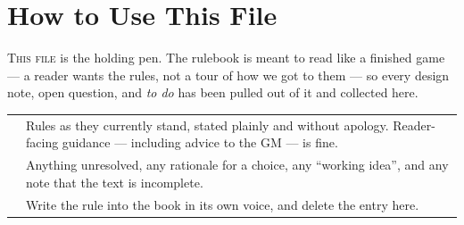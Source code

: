 \documentclass[11pt,oneside]{memoir}
\newcommand{\thc}[1]{\leavevmode{\hdfont\bfseries\color{white}#1}}
\begin{document}
\color{atrInk}

\begin{titlingpage}
\end{titlingpage}

\frontmatter
\tableofcontents

\mainmatter

\chapter{How to Use This File}

\lettrine{T}{his file} is the holding pen. The rulebook is meant to read
like a finished game --- a reader wants the rules, not a tour of how we got
to them --- so every design note, open question, and \emph{to do} has been
pulled out of it and collected here.

\begin{statblock}
\begin{tabularx}{\linewidth}{@{}p{4.2cm} Y@{}}
 & Rules as they currently stand, stated plainly and without apology. Reader-facing guidance --- including advice to the GM --- is fine.\\[3pt]
 & Anything unresolved, any rationale for a choice, any ``working idea'', and any note that the text is incomplete.\\[3pt]
 & Write the rule into the book in its own voice, and delete the entry here.\\
\end{tabularx}
\end{statblock}
\end{document}
